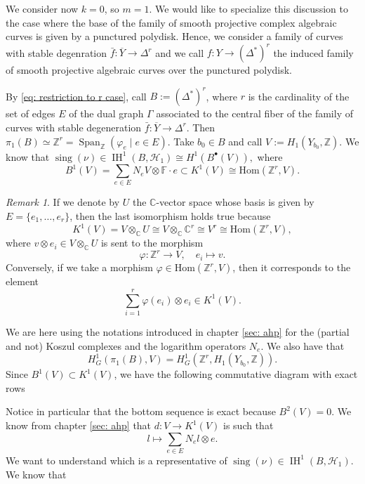 \documentclass[a4paper,12 pt,titlepage,twoside]{book}
\newcommand{\numberset}{\mathbb}
\newcommand{\Z}{\numberset{Z}}
\newcommand{\F}{\numberset{F}}
\newcommand{\C}{\numberset{C}}
\DeclareMathOperator{\Span}{Span}
\DeclareMathOperator{\sing}{sing}
\DeclareMathOperator{\IH}{IH}
\theoremstyle{plain}
\theoremstyle{theorem}
\theoremstyle{definition}
\theoremstyle{remark}
\newtheorem{oss}[thm]{Remark}
\begin{document}
	We consider now $k=0$, so $m=1$. We would like to specialize this discussion to the case where the base of the family of smooth projective complex algebraic curves is given by a punctured polydisk. Hence, we consider a family of curves with stable degenration $\bar{f} \colon \overline{Y} \rightarrow \Delta^r$ and we call $f \colon Y \rightarrow (\Delta^*)^r$ the induced family of smooth projective algebraic curves over the punctured polydisk.
	
	By \eqref{eq: restriction to r case}, call $B := (\Delta^*)^r$, where $r$ is the cardinality of the set of edges $E$ of the dual graph $\Gamma$ associated to the central fiber of the family of curves with stable degeneration $\bar{f} \colon \overline{Y} \rightarrow \Delta^r$. Then $\pi_1(B) \simeq \Z^r = \Span_\Z(\varphi_e \mid e \in E).$ Take $b_0 \in B$ and call $V:= H_{1}(Y_{b_0}, \Z)$.
	We know that $\sing(\nu) \in \IH^1(B, \mathcal{H}_1) \cong H^1(B^\bullet(V)), $ where $$B^1(V)= \sum_{e \in E} N_eV \otimes \F \cdot e \subset K^1(V) \cong \text{Hom}(\Z^r, V).$$
	\begin{oss}\label{K^1(V)}
		If we denote by $U$ the $\C$-vector space whose basis is given by $E= \{e_1, \dots, e_r\}$, then the last isomorphism holds true because $$K^1(V) = V \otimes_\C U \cong V \otimes_\C \C^r \cong V^r \cong \text{Hom}(\Z^r, V),$$ where $v \otimes e_i \in V \otimes_\C U$ is sent to the morphism $$\varphi \colon \Z^r \rightarrow V, \quad e_i \mapsto v.$$ Conversely, if we take a morphism $\varphi \in \text{Hom}(\Z^r, V)$, then it corresponds to the element $$\sum_{i=1}^r \varphi(e_i) \otimes e_i \in K^1(V).$$
	\end{oss}
	We are here using the notations introduced in chapter \ref{sec: ahp} for the (partial and not) Koszul complexes and the logarithm operators $N_e$. We also have that $$H^1_G(\pi_1(B), V) = H^1_G(\Z^r, H_{1}(Y_{b_0},\Z)).$$ Since $B^1(V) \subset K^1(V)$, we have the following commutative diagram with exact rows \begin{center}
	\end{center}
	Notice in particular that the bottom sequence is exact because $B^2(V)=0$. We know from chapter \ref{sec: ahp} that $d \colon V \rightarrow K^1(V)$ is such that $$l \mapsto \sum_{e \in E} N_el \otimes e.$$ We want to understand which is a representative of $\sing(\nu)\in \IH^1(B, \mathcal{H}_1).$ We know that 
\end{document}
